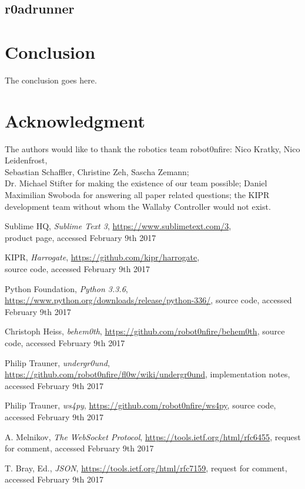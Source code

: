 \documentclass[conference]{IEEEtran}
\begin{document}
\subsection{r0adrunner}

\section{Conclusion}
The conclusion goes here.


\section*{Acknowledgment}
The authors would like to thank the robotics team robot0nfire: Nico Kratky, Nico Leidenfrost,\\ Sebastian Schaffler, Christine Zeh, Sascha Zemann;\\ Dr. Michael Stifter for making the existence of our team possible; Daniel Maximilian Swoboda for answering all paper related questions; the KIPR development team without whom the Wallaby Controller would not exist.

\begin{thebibliography}{1}

Sublime HQ, \emph{Sublime Text 3}, \url{https://www.sublimetext.com/3},\\ product page,
accessed February 9th 2017

KIPR, \emph{Harrogate}, \url{https://github.com/kipr/harrogate},\\ source code,
accessed February 9th 2017

Python Foundation, \emph{Python 3.3.6}, \url{https://www.python.org/downloads/release/python-336/}, source code, accessed February 9th 2017

Christoph Heiss, \emph{behem0th}, \url{https://github.com/robot0nfire/behem0th}, source code, accessed February 9th 2017

Philip Trauner, \emph{undergr0und}, \url{https://github.com/robot0nfire/fl0w/wiki/undergr0und}, implementation notes, accessed February 9th 2017

Philip Trauner, \emph{ws4py}, \url{https://github.com/robot0nfire/ws4py}, source code, accessed February 9th 2017

A. Melnikov, \emph{The WebSocket Protocol}, \url{https://tools.ietf.org/html/rfc6455}, request for comment, accessed February 9th 2017

T. Bray, Ed., \emph{JSON}, \url{https://tools.ietf.org/html/rfc7159}, request for comment, accessed February 9th 2017

\end{thebibliography}
\end{document}

